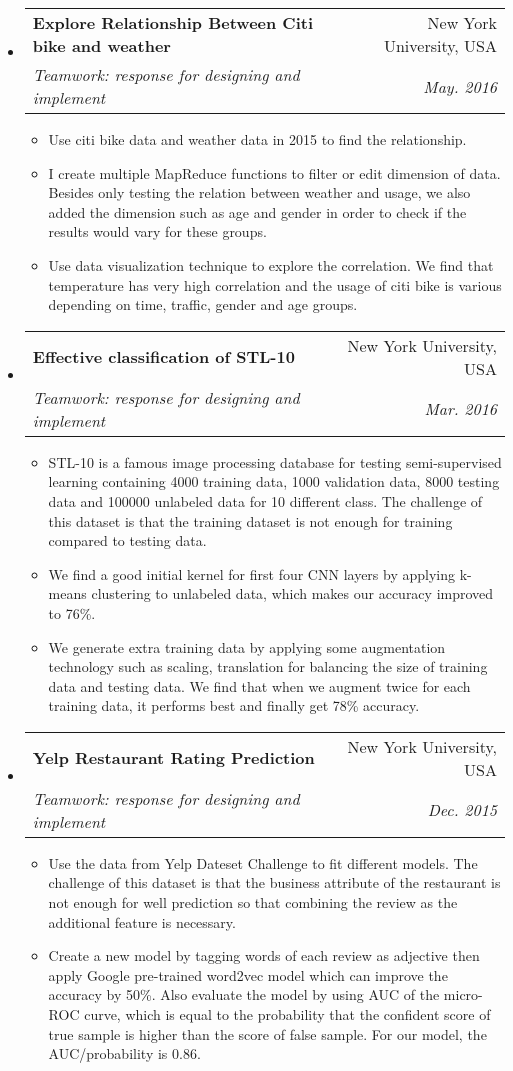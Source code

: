 \documentclass[a4paper,11pt]{article}
\makeatletter
\newcommand{\resitem}[1]{\item #1 \vspace{-2pt}}
\renewcommand{\normalsize}{\fontsize{12pt}{\baselineskip}\selectfont}
\newcommand{\ressubheading}[4]{
	\begin{tabular*}{6.5in}{l@{\extracolsep{\fill}}r}
		\textbf{#1} & #2 \\
		\textit{#3} & \textit{#4} \\
	\end{tabular*}\vspace{-6pt}}
\makeatother
\begin{document}
\begin{itemize}
				\item \ressubheading{\normalsize Explore Relationship Between Citi bike and weather}{New York University, USA}{\normalsize Teamwork: response for designing and implement}{May. 2016}
				\begin{itemize}
					\resitem{Use citi bike data and weather data in 2015 to find the relationship.}
					\resitem{I create multiple MapReduce functions to filter or edit dimension of data. Besides only testing the relation between weather and usage, we also added the dimension such as age and gender in order to check if the results would vary for these groups.}
					\resitem{Use data visualization technique to explore the correlation. We find that temperature has very high correlation and the usage of citi bike is various depending on time, traffic, gender and age groups.}
				\end{itemize}
			\item \ressubheading{{\normalsize Effective classification of STL-10}}{New York University, USA}{\normalsize Teamwork: response for designing and implement}{Mar. 2016}
			
			\begin{itemize}
				\resitem{STL-10 is a famous image processing database for testing semi-supervised learning containing 4000 training data, 1000 validation data, 8000 testing data and 100000 unlabeled data for 10 different class. The challenge of this dataset is that the training dataset is not enough for training compared to testing data.}
				\resitem{We find a good initial kernel for first four CNN layers by applying k-means clustering to unlabeled data, which makes our accuracy improved to 76\%.} 
				\resitem{We generate extra training data by applying some augmentation technology such as scaling, translation for balancing the size of training data and testing data. We find that when we augment twice for each training data, it performs best and finally get 78\% accuracy.}
			\end{itemize}
			
				\item \ressubheading{{\normalsize Yelp Restaurant Rating Prediction}}{New York University, USA}{\normalsize Teamwork: response for designing and implement}{Dec. 2015}
				
					\begin{itemize}
						\resitem{Use the data from Yelp Dateset Challenge to fit different models. The challenge of this dataset is that the business attribute of the restaurant is not enough for well prediction so that combining the review as the additional feature is necessary.}
						\resitem{Create a new model by tagging words of each review as adjective then apply Google pre-trained word2vec model which can improve the accuracy by 50\%. Also evaluate the model by using AUC of the micro-ROC curve, which is equal to the probability that the confident score of true sample is higher than the score of false sample. For our model, the AUC/probability is 0.86.}
					\end{itemize}
			

\end{itemize}
\end{document}
